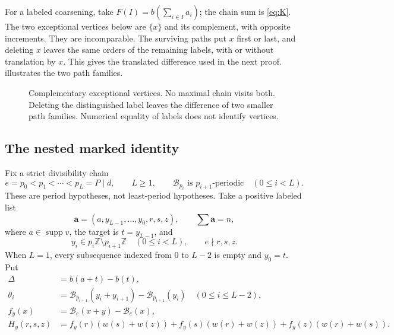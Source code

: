 \documentclass[11pt,a4paper]{amsart}
\numberwithin{equation}{section}
\theoremstyle{plain}
\theoremstyle{definition}
\newcommand{\Z}{\mathbb Z}
\newcommand{\supp}{\operatorname{supp}}
\begin{document}
For a labeled coarsening, take
\(F(I)=b(\sum_{i\in I}a_i)\); the chain sum is \eqref{eq:K}.
The two exceptional vertices below are \(\{x\}\) and its complement,
with opposite increments.  They are incomparable.  The surviving paths
put \(x\) first or last, and deleting \(x\) leaves the same orders of
the remaining labels, with or without translation by \(x\).
This gives the translated difference used in the next proof.
 illustrates the two path families.

\begin{figure}[ht]
\centering
{}
\caption{Complementary exceptional vertices.  No maximal chain visits both.
Deleting the distinguished label leaves the difference of two smaller
path families.  Numerical equality of labels does not identify vertices.}
\label{fig:antichain}
\end{figure}

\subsection{The nested marked identity}
Fix a strict divisibility chain
\begin{equation}\label{eq:chain}
e=p_0<p_1<\cdots<p_L=P\mid d,\qquad L\ge1,
\qquad \mathcal B_{p_i}\text{ is }p_{i+1}\text{-periodic}\quad(0\le i<L).
\end{equation}
These are period hypotheses, not least-period hypotheses.  Take a positive
labeled list
\begin{equation}\label{eq:detector-list}
\mathbf a=(a,y_{L-1},\ldots,y_0,r,s,z),\qquad \sum\mathbf a=n,
\end{equation}
where \(a\in\supp v\), the target is \(t=y_{L-1}\), and
\begin{equation}\label{eq:layers}
y_i\in p_i\Z\setminus p_{i+1}\Z\quad(0\le i<L),\qquad e\nmid r,s,z.
\end{equation}
When \(L=1\), every subsequence indexed from \(0\) to \(L-2\) is empty
and \(y_0=t\).  Put
\begin{equation}\label{eq:deltaH}
\begin{split}
\Delta&=b(a+t)-b(t),\\
\theta_i&=\mathcal B_{p_{i+1}}(y_i+y_{i+1})-\mathcal B_{p_{i+1}}(y_i)\quad(0\le i\le L-2),\\
f_y(x)&=\mathcal B_e(x+y)-\mathcal B_e(x),\\
H_y(r,s,z)&=f_y(r)(w(s)+w(z))+f_y(s)(w(r)+w(z))
+f_y(z)(w(r)+w(s)).
\end{split}
\end{equation}
\end{document}

